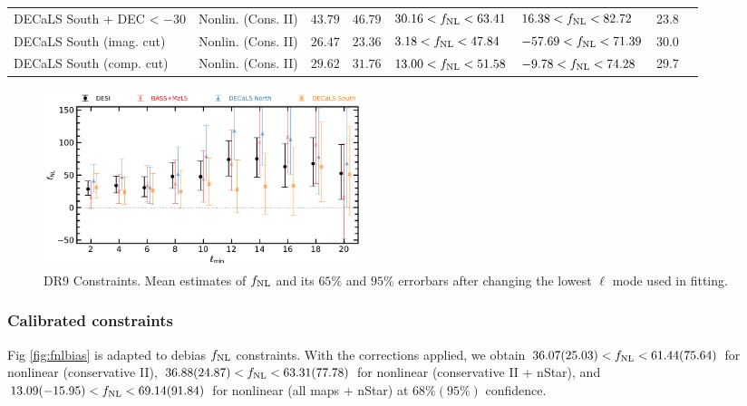 \begin{table}
{\begin{tabular}{llllllll}
DECaLS South + DEC < $-30$ & Nonlin. (Cons. II)& $ 43.79$& $ 46.79$& $ 30.16<f_{\rm NL}< 63.41$& $ 16.38<f_{\rm NL}< 82.72$ &   23.8\\
DECaLS South (imag. cut)        & Nonlin. (Cons. II)& $ 26.47$& $ 23.36$& $  3.18<f_{\rm NL}< 47.84$& $-57.69<f_{\rm NL}< 71.39$ &   30.0\\
DECaLS South (comp. cut)       & Nonlin. (Cons. II)& $ 29.62$& $ 31.76$& $ 13.00<f_{\rm NL}< 51.58$& $ -9.78<f_{\rm NL}< 74.28$ &   29.7\\
   \hline
    \end{tabular}
}
\end{table}


\begin{figure}
    \centering
    \includegraphics[width=0.45\textwidth]{figures/fnl_elmin.pdf}     
    \caption{DR9 Constraints. Mean estimates of $f_{\rm NL}$ and its $65$\% and $95$\% errorbars after changing the lowest $\ell$ mode used in fitting.}\label{fig:mcmc_dr9elmin}
\end{figure}


\subsubsection{Calibrated constraints}
Fig \ref{fig:fnlbias} is adapted to debias $f_{\rm NL}$ constraints. With the corrections applied, we obtain $36.07 (25.03) < f_{\rm NL} < 61.44(75.64)$ for nonlinear (conservative II), $36.88(24.87) < f_{\rm NL} < 63.31(77.78)$ for nonlinear (conservative II + nStar), and $13.09(-15.95) < f_{\rm NL} < 69.14(91.84)$ for nonlinear (all maps + nStar) at $68\% (95\%)$ confidence. 



